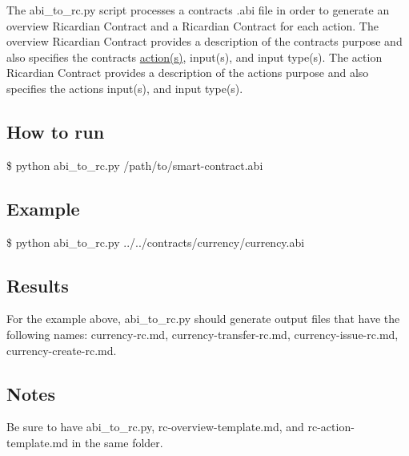 The {\ttfamily abi\+\_\+to\+\_\+rc.\+py} script processes a contract\textquotesingle{}s .abi file in order to generate an overview Ricardian Contract and a Ricardian Contract for each action. The overview Ricardian Contract provides a description of the contract\textquotesingle{}s purpose and also specifies the contract\textquotesingle{}s \mbox{\hyperlink{structaction}{action(s)}}, input(s), and input type(s). The action Ricardian Contract provides a description of the action\textquotesingle{}s purpose and also specifies the action\textquotesingle{}s input(s), and input type(s).

\subsection*{How to run}

{\ttfamily \$ python abi\+\_\+to\+\_\+rc.\+py /path/to/smart-\/contract.abi}

\subsection*{Example}

{\ttfamily \$ python abi\+\_\+to\+\_\+rc.\+py ../../contracts/currency/currency.abi}

\subsection*{Results}

For the example above, {\ttfamily abi\+\_\+to\+\_\+rc.\+py} should generate output files that have the following names\+: {\ttfamily currency-\/rc.\+md}, {\ttfamily currency-\/transfer-\/rc.\+md}, {\ttfamily currency-\/issue-\/rc.\+md}, {\ttfamily currency-\/create-\/rc.\+md}.

\subsection*{Notes}

Be sure to have {\ttfamily abi\+\_\+to\+\_\+rc.\+py}, {\ttfamily rc-\/overview-\/template.\+md}, and {\ttfamily rc-\/action-\/template.\+md} in the same folder. 
